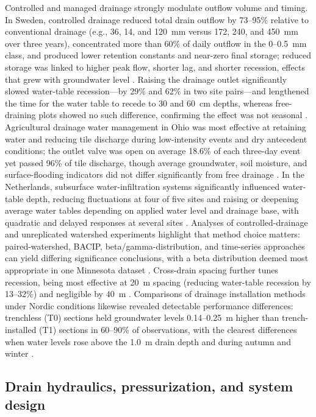 \documentclass[11pt]{article}
\begin{document}
Controlled and managed drainage strongly modulate outflow volume and timing. In Sweden, controlled drainage reduced total drain outflow by 73--95\% relative to conventional drainage (e.g., 36, 14, and 120~mm versus 172, 240, and 450~mm over three years), concentrated more than 60\% of daily outflow in the 0--0.5~mm class, and produced lower retention constants and near-zero final storage; reduced storage was linked to higher peak flow, shorter lag, and shorter recession, effects that grew with groundwater level \parencite{Wesström2003}. Raising the drainage outlet significantly slowed water-table recession---by 29\% and 62\% in two site pairs---and lengthened the time for the water table to recede to 30 and 60~cm depths, whereas free-draining plots showed no such difference, confirming the effect was not seasonal \parencite{Saadat2017}. Agricultural drainage water management in Ohio was most effective at retaining water and reducing tile discharge during low-intensity events and dry antecedent conditions; the outlet valve was open on average 18.6\% of each three-day event yet passed 96\% of tile discharge, though average groundwater, soil moisture, and surface-flooding indicators did not differ significantly from free drainage \parencite{Miller2022}. In the Netherlands, subsurface water-infiltration systems significantly influenced water-table depth, reducing fluctuations at four of five sites and raising or deepening average water tables depending on applied water level and drainage base, with quadratic and delayed responses at several sites \parencite{vandeCraats2025}. Analyses of controlled-drainage and unreplicated watershed experiments highlight that method choice matters: paired-watershed, BACIP, beta/gamma-distribution, and time-series approaches can yield differing significance conclusions, with a beta distribution deemed most appropriate in one Minnesota dataset \parencite{Pagliari2021}. Cross-drain spacing further tunes recession, being most effective at 20~m spacing (reducing water-table recession by 13--32\%) and negligible by 40~m \parencite{Vaiciukynas2015}. Comparisons of drainage installation methods under Nordic conditions likewise revealed detectable performance differences: trenchless (T0) sections held groundwater levels 0.14--0.25~m higher than trench-installed (T1) sections in 60--90\% of observations, with the clearest differences when water levels rose above the 1.0~m drain depth and during autumn and winter \parencite{Salo2019}.

\subsection{Drain hydraulics, pressurization, and system design}
\end{document}
